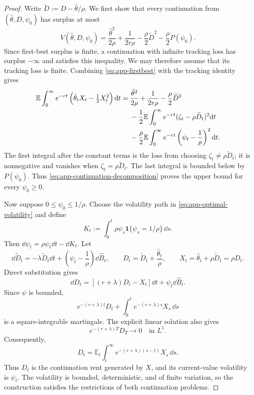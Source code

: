 \documentclass[12pt]{article}
\newcommand{\E}{\mathbb{E}}
\newcommand{\hth}{\hat\theta}
\newcommand{\hB}{\hat B}
\begin{document}
\begin{proof}
Write \(\widetilde D:=D-\hth/\rho\). We first show that every continuation
from \((\hth,D,\psi_0)\) has surplus at most
\[
  V(\hth,D,\psi_0)
  =
  \frac{\hth^2}{2\rho}+\frac1{2r\rho}
  -\frac{\rho}{2}\widetilde D^2
  -\frac{\rho}{2}P(\psi_0).
\]
Since first-best surplus is finite, a continuation with infinite tracking
loss has surplus \(-\infty\) and satisfies this inequality. We may therefore
assume that its tracking loss is finite. Combining
\eqref{eq:app-firstbest} with the tracking identity gives
\begin{align}
  \E\int_0^\infty e^{-rt}
    \left(\hth_tX_t-\tfrac12X_t^2\right)\dd t
  ={}&
  \frac{\hth^2}{2\rho}+\frac1{2r\rho}
  -\frac{\rho}{2}\widetilde D^2 \notag\\
  &-\frac12\E\int_0^\infty e^{-rt}
    (\zeta_t-\rho\widetilde D_t)^2\dd t \notag\\
  &-\frac{\rho}{2}\E\int_0^\infty e^{-rt}
    \left(\psi_t-\frac1\rho\right)^2\dd t.
  \label{eq:app-continuation-decomposition}
\end{align}
The first integral after the constant terms is the loss from choosing
\(\zeta_t\neq\rho\widetilde D_t\); it is nonnegative and vanishes when
\(\zeta_t=\rho\widetilde D_t\). The last integral is bounded below by
\(P(\psi_0)\). Thus \eqref{eq:app-continuation-decomposition} proves the
upper bound for every \(\psi_0\geq0\).

Now suppose \(0\leq\psi_0\leq1/\rho\). Choose the volatility path in
\eqref{eq:app-optimal-volatility} 
and define
\[
  K_t:=\int_0^t\rho\psi_s
    \mathbf 1\{\psi_s=1/\rho\}\,\dd s.
\]
Then \(\dd\psi_t=\rho\psi_t\dd t-\dd K_t\). Let
\[
  \dd\widetilde D_t
  =-\lambda\widetilde D_t\dd t
   +\left(\psi_t-\frac1\rho\right)\dd\hB_t,
  \qquad
  D_t=\widetilde D_t+\frac{\hth_t}{\rho},
  \qquad
  X_t=\hth_t+\rho\widetilde D_t=\rho D_t.
\]
Direct substitution gives
\[
  \dd D_t=[(r+\lambda)D_t-X_t]\dd t+\psi_t\dd\hB_t.
\]
Since \(\psi\) is bounded,
\[
  e^{-(r+\lambda)t}D_t
  +\int_0^t e^{-(r+\lambda)s}X_s\,\dd s
\]
is a square-integrable martingale. The explicit linear solution also gives
\[
  e^{-(r+\lambda)T}D_T\longrightarrow0
  \quad\text{in }L^1.
\]
Consequently,
\[
  D_t=\E_t\int_t^\infty
    e^{-(r+\lambda)(s-t)}X_s\,\dd s.
\]
Thus \(D_t\) is the continuation rent generated by \(X\), and its
current-value volatility is \(\psi_t\). The volatility is bounded,
deterministic, and of finite variation, so the construction satisfies the
restrictions of both continuation problems.


\end{proof}
\end{document}
